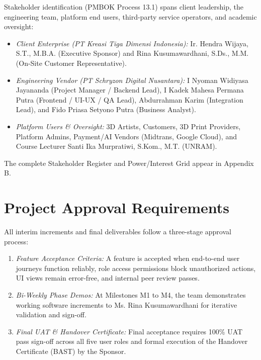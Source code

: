 \documentclass[11pt,a4paper]{article}
\begin{document}
Stakeholder identification (PMBOK Process 13.1) spans client leadership, the engineering team, platform end users, third-party service operators, and academic oversight:
\begin{itemize}[leftmargin=1.5em, itemsep=1.5pt, topsep=2pt]
    \item \textit{Client Enterprise (PT Kreasi Tiga Dimensi Indonesia):} Ir. Hendra Wijaya, S.T., M.B.A. (Executive Sponsor) and Rina Kusumawardhani, S.Ds., M.M. (On-Site Customer Representative).
    \item \textit{Engineering Vendor (PT Schryzon Digital Nusantara):} I Nyoman Widiyasa Jayananda (Project Manager / Backend Lead), I Kadek Mahesa Permana Putra (Frontend / UI-UX / QA Lead), Abdurrahman Karim (Integration Lead), and Fido Priasa Setyono Putra (Business Analyst).
    \item \textit{Platform Users \& Oversight:} 3D Artists, Customers, 3D Print Providers, Platform Admins, Payment/AI Vendors (Midtrans, Google Cloud), and Course Lecturer Santi Ika Murpratiwi, S.Kom., M.T. (UNRAM).
\end{itemize}
The complete Stakeholder Register and Power/Interest Grid appear in Appendix B.

\vspace{-4pt}
\section{Project Approval Requirements}

All interim increments and final deliverables follow a three-stage approval process:
\begin{enumerate}[leftmargin=1.5em, itemsep=1.5pt, topsep=2pt]
    \item \textit{Feature Acceptance Criteria:} A feature is accepted when end-to-end user journeys function reliably, role access permissions block unauthorized actions, UI views remain error-free, and internal peer review passes.
    \item \textit{Bi-Weekly Phase Demos:} At Milestones M1 to M4, the team demonstrates working software increments to Ms. Rina Kusumawardhani for iterative validation and sign-off.
    \item \textit{Final UAT \& Handover Certificate:} Final acceptance requires 100\% UAT pass sign-off across all five user roles and formal execution of the Handover Certificate (BAST) by the Sponsor.
\end{enumerate}
\end{document}
